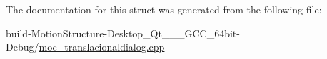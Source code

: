 The documentation for this struct was generated from the following file\-:\begin{DoxyCompactItemize}
\item 
build-\/\-Motion\-Structure-\/\-Desktop\-\_\-\-Qt\-\_\-\_\-\_\-\-G\-C\-C\-\_\-64bit-\/\-Debug/\hyperlink{moc__translacionaldialog_8cpp}{moc\-\_\-translacionaldialog.\-cpp}\end{DoxyCompactItemize}
